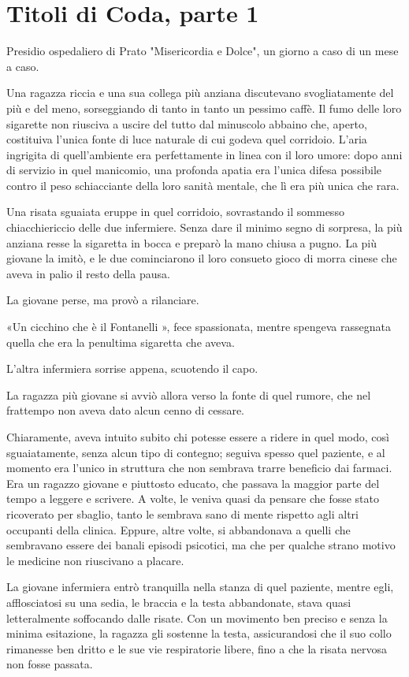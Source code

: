 \chapter{Titoli di Coda, parte 1}

Presidio ospedaliero di Prato "Misericordia e Dolce", un giorno a caso di un mese a caso.

Una ragazza riccia e una sua collega più anziana discutevano svogliatamente del più e del meno, sorseggiando di tanto in tanto un pessimo caffè. Il fumo delle loro sigarette non riusciva a uscire del tutto dal minuscolo abbaino che, aperto, costituiva l'unica fonte di luce naturale di cui godeva quel corridoio. L'aria ingrigita di quell'ambiente era perfettamente in linea con il loro umore: dopo anni di servizio in quel manicomio, una profonda apatia era l'unica difesa possibile contro il peso schiacciante della loro sanità mentale, che lì era più unica che rara.

Una risata sguaiata eruppe in quel corridoio, sovrastando il sommesso chiacchiericcio delle due infermiere. Senza dare il minimo segno di sorpresa, la più anziana resse la sigaretta in bocca e preparò la mano chiusa a pugno. La più giovane la imitò, e le due cominciarono il loro consueto gioco di morra cinese che aveva in palio il resto della pausa.

La giovane perse, ma provò a rilanciare.

«Un cicchino che è il Fontanelli », fece spassionata, mentre spengeva rassegnata quella che era la penultima sigaretta che aveva.

L'altra infermiera sorrise appena, scuotendo il capo.

La ragazza più giovane si avviò allora verso la fonte di quel rumore, che nel frattempo non aveva dato alcun cenno di cessare. 

Chiaramente, aveva intuito subito chi potesse essere a ridere in quel modo, così sguaiatamente, senza alcun tipo di contegno; seguiva spesso quel paziente, e al momento era l'unico in struttura che non sembrava trarre beneficio dai farmaci. Era un ragazzo giovane e piuttosto educato, che passava la maggior parte del tempo a leggere e scrivere. A volte, le veniva quasi da pensare che fosse stato ricoverato per sbaglio, tanto le sembrava sano di mente rispetto agli altri occupanti della clinica. Eppure, altre volte, si abbandonava a quelli che sembravano essere dei banali episodi psicotici, ma che per qualche strano motivo le medicine non riuscivano a placare.

La giovane infermiera entrò tranquilla nella stanza di quel paziente, mentre egli, afflosciatosi su una sedia, le braccia e la testa abbandonate, stava quasi letteralmente soffocando dalle risate. Con un movimento ben preciso e senza la minima esitazione, la ragazza gli sostenne la testa, assicurandosi che il suo collo rimanesse ben dritto e le sue vie respiratorie libere, fino a che la risata nervosa non fosse passata.

